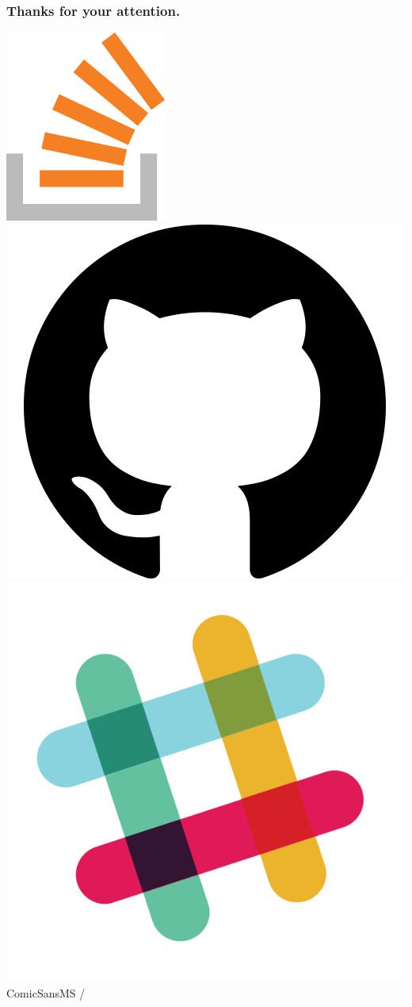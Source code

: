 \documentclass[aspectratio=169]{beamer}
\begin{document}
\begin{frame}
  \frametitle{Thanks for your attention.}

  \href{https://stackoverflow.com/users/577603/comicsansms}{\includegraphics[height=.05\textheight]{resources/so-icon.png}}
  \href{https://github.com/ComicSansMS}{\includegraphics[height=.05\textheight]{resources/github-icon.png}}
  \includegraphics[height=.05\textheight]{resources/slack-icon.png} ComicSansMS /

\end{frame}
\end{document}
